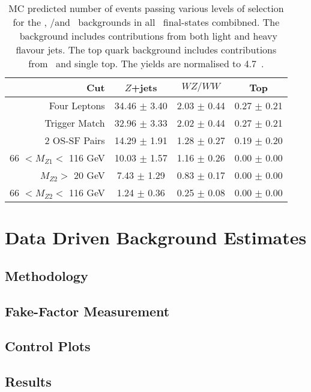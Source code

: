 \begin{table}[htbp]
  \centering
  \begin{tabular}{r|c|c|c} 
    \hline\hline
                 Cut &               $Z$+jets &             $WZ/WW$ &               Top\\ 
    \hline
        Four Leptons &  34.46 $\pm$ 3.40 & 2.03 $\pm$ 0.44 & 0.27 $\pm$ 0.21 \\ 
       Trigger Match &  32.96 $\pm$ 3.33 & 2.02 $\pm$ 0.44 & 0.27 $\pm$ 0.21 \\ 
       2 OS-SF Pairs &  14.29 $\pm$ 1.91 & 1.28 $\pm$ 0.27 & 0.19 $\pm$ 0.20 \\ 
66 $ < M_{Z1} < $ 116 GeV &  10.03 $\pm$ 1.57 & 1.16 $\pm$ 0.26 & 0.00 $\pm$ 0.00 \\ 
  $M_{Z2} > $ 20 GeV &  7.43 $\pm$ 1.29 & 0.83 $\pm$ 0.17 & 0.00 $\pm$ 0.00 \\ 
66 $ < M_{Z2} < $ 116 GeV &  1.24 $\pm$ 0.36 & 0.25 $\pm$ 0.08 & 0.00 $\pm$ 0.00 \\ 
    \hline\hline
  \end{tabular}
  \caption[MC predicted number of events passing various levels of selection for
  the \Zjets, \WZ/\WW and \topquark\ backgrounds in all \llll\ final-states
  combined.]
  {MC predicted number of events passing various levels of selection for
  the \Zjets, \WZ/\WW and \topquark\ backgrounds in all \llll\ final-states
  combibned. The
  \Zjets\ background includes contributions from both light and heavy flavour
  jets. The top quark background includes contributions from \ttbar\ and
  single top. The yields are normalised to 4.7~\ifb.
  }
  \label{table:mc-bg-4l}
\end{table}

\section{Data Driven Background Estimates}
\label{sec:ddbg}

\subsection{Methodology}
\subsection{Fake-Factor Measurement}
\subsection{Control Plots}
\subsection{Results}
